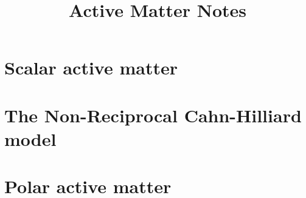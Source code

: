 \documentclass[10pt, a4paper, oneside]{book}
\title{Active Matter Notes}
\begin{document}
    \maketitle
    \clearpage


    \tableofcontents
    \clearpage

    \setlength{\parindent}{0em}
    \setlength{\parskip}{0.8em}

    

    \chapter{Scalar active matter}
    

    \chapter{The Non-Reciprocal Cahn-Hilliard model}
    

    \chapter{Polar active matter}
    



    
    
\end{document}
